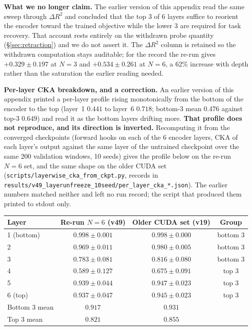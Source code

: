 \textbf{What we no longer claim.}  The earlier version of this appendix read the
same sweep through $\Delta R^2$ and concluded that the top 3 of 6 layers suffice
to reorient the encoder toward the trained objective while the lower 3 are
required for task recovery.  That account rests entirely on the withdrawn probe
quantity (\S\ref{sec:retraction}) and we do not assert it.  The $\Delta R^2$
column is retained so the withdrawn computation stays auditable; for the record
the re-run gives $+0.329{\pm}0.197$ at $N{=}3$ and $+0.534{\pm}0.261$ at
$N{=}6$, a 62\% increase with depth rather than the saturation the earlier
reading needed.

\textbf{Per-layer CKA breakdown, and a correction.}  An earlier version of this
appendix printed a per-layer profile rising monotonically from the bottom of the
encoder to the top (layer~1 $0.441$ to layer~6 $0.718$; bottom-3 mean $0.476$
against top-3 $0.649$) and read it as the bottom layers drifting more.  \textbf{That
profile does not reproduce, and its direction is inverted.}  Recomputing it from
the converged checkpoints (forward hooks on each of the 6 encoder layers, CKA of
each layer's output against the same layer of the untrained checkpoint over the
same 200 validation windows, 10 seeds) gives the profile below on the re-run
$N{=}6$ set, and the same shape on the older CUDA set
(\texttt{scripts/layerwise\_cka\_from\_ckpt.py}, records in
\texttt{results/v49\_layerunfreeze\_10seed/per\_layer\_cka\_*.json}).  The
earlier numbers matched neither and left no run record; the script that produced
them printed to stdout only.

\begin{center}
\small
\begin{tabular}{lccc}
\toprule
Layer & Re-run $N{=}6$ (v49) & Older CUDA set (v19) & Group \\
\midrule
1 (bottom) & $0.998{\pm}0.001$ & $0.998{\pm}0.000$ & bottom 3 \\
2          & $0.969{\pm}0.011$ & $0.980{\pm}0.005$ & bottom 3 \\
3          & $0.783{\pm}0.081$ & $0.816{\pm}0.080$ & bottom 3 \\
4          & $0.589{\pm}0.127$ & $0.675{\pm}0.091$ & top 3 \\
5          & $0.939{\pm}0.044$ & $0.947{\pm}0.023$ & top 3 \\
6 (top)    & $0.937{\pm}0.047$ & $0.945{\pm}0.023$ & top 3 \\
\midrule
Bottom 3 mean & $0.917$ & $0.931$ & \\
Top 3 mean    & $0.821$ & $0.855$ & \\
\bottomrule
\end{tabular}
\end{center}


